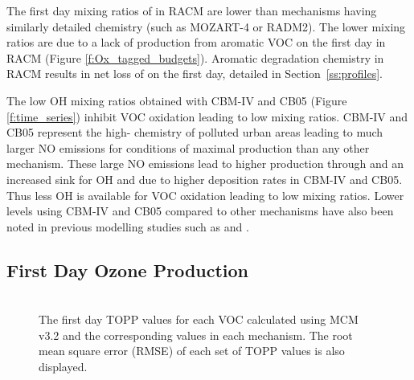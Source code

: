 The first day mixing ratios of  in RACM are lower than mechanisms having similarly detailed chemistry (such as MOZART-4 or RADM2).
The lower  mixing ratios are due to a lack of  production from aromatic VOC on the first day in RACM (Figure \ref{f:Ox_tagged_budgets}).
Aromatic degradation chemistry in RACM results in net loss of  on the first day, detailed in \mbox{Section \ref{ss:profiles}}.

The low OH mixing ratios obtained with CBM-IV and CB05 (Figure \ref{f:time_series}) inhibit VOC oxidation leading to low  mixing ratios.
CBM-IV and CB05 represent the high- chemistry of polluted urban areas leading to much larger NO emissions for conditions of maximal  production than any other mechanism.
These large NO emissions lead to higher  production through  and an increased sink for OH and  due to higher  deposition rates in CBM-IV and CB05.
Thus less OH is available for VOC oxidation leading to low  mixing ratios.
Lower  levels using CBM-IV and CB05 compared to other mechanisms have also been noted in previous modelling studies such as \citet{Emmerson:2009} and \citet{Saylor:2012}.

\subsection{First Day Ozone Production} \label{ss:day1} %

\begin{figure}
    \centering
    \includegraphics[width=\textwidth]{img/first_day_values}
    \vspace{1mm}
    \caption{The first day TOPP values for each VOC calculated using MCM v3.2 and the corresponding values in each mechanism. The root mean square error (RMSE) of each set of TOPP values is also displayed.}
    \vspace{-4mm}
    \label{f:first_day}
\end{figure}

